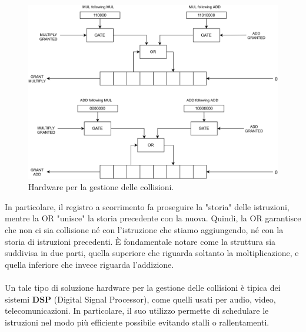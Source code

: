 \begin{figure}[ht]
    \centering
    \includegraphics[width=0.7\linewidth]{img/superscalari_collisioni.png}
    \caption{Hardware per la gestione delle collisioni.}
    \label{fig:hardware-coll}
\end{figure}
In particolare, il registro a scorrimento fa proseguire la "storia" delle istruzioni, mentre la OR "unisce" la storia precedente con la nuova. Quindi, la OR garantisce che non ci sia collisione né con l'istruzione che stiamo aggiungendo, né con la storia di istruzioni precedenti. \MakeUppercase{è} fondamentale notare come la struttura sia suddivisa in due parti, quella superiore che riguarda soltanto la moltiplicazione, e quella inferiore che invece riguarda l'addizione.
\\
\\
Un tale tipo di soluzione hardware per la gestione delle collisioni è tipica dei sistemi \textbf{DSP} (Digital Signal Processor), come quelli usati per audio, video, telecomunicazioni. In particolare, il suo utilizzo permette di schedulare le istruzioni nel modo più efficiente possibile evitando stalli o rallentamenti.